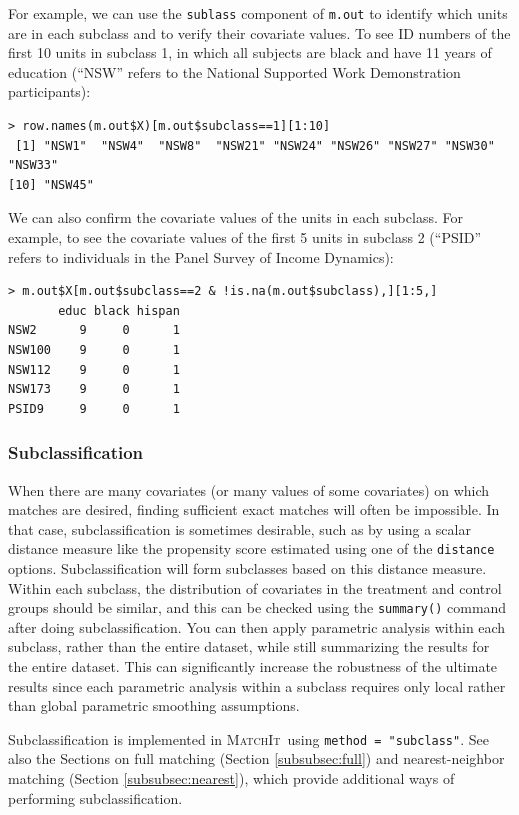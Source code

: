 \documentclass[oneside,letterpaper,titlepage]{article}
\newcommand{\MatchIt}{\textsc{MatchIt}}
\begin{document}
For example, we can use the {\tt sublass} component of {\tt m.out} to
identify which units are in each subclass and to verify their
covariate values.  To see ID numbers of the first 10 units in subclass
1, in which all subjects are black and have 11 years of education
(``NSW'' refers to the National Supported Work Demonstration
participants):
\begin{verbatim}
> row.names(m.out$X)[m.out$subclass==1][1:10]
 [1] "NSW1"  "NSW4"  "NSW8"  "NSW21" "NSW24" "NSW26" "NSW27" "NSW30" "NSW33"
[10] "NSW45"
\end{verbatim}
We can also confirm the covariate values of the units in each
subclass.  For example, to see the covariate values of the first 5
units in subclass 2 (``PSID'' refers to individuals in the Panel
Survey of Income Dynamics):
\begin{verbatim}
> m.out$X[m.out$subclass==2 & !is.na(m.out$subclass),][1:5,]
       educ black hispan
NSW2      9     0      1
NSW100    9     0      1
NSW112    9     0      1
NSW173    9     0      1
PSID9     9     0      1
\end{verbatim}


\subsubsection{Subclassification}
\label{subsubsec:subclass}

When there are many covariates (or many values of some covariates) on
which matches are desired, finding sufficient exact matches will often
be impossible.  In that case, subclassification is sometimes
desirable, such as by using a scalar distance measure like the
propensity score estimated using one of the \texttt{distance} options.
Subclassification will form subclasses based on this distance measure.
Within each subclass, the distribution of covariates in the treatment
and control groups should be similar, and this can be checked using
the \texttt{summary()} command after doing subclassification.  You can
then apply parametric analysis within each subclass, rather than the
entire dataset, while still summarizing the results for the entire
dataset.  This can significantly increase the robustness of the
ultimate results since each parametric analysis within a subclass
requires only local rather than global parametric smoothing
assumptions.

Subclassification is implemented in \MatchIt\ using \texttt{method =
  "subclass"}.  See also the Sections on full matching (Section
\ref{subsubsec:full}) and nearest-neighbor matching (Section
\ref{subsubsec:nearest}), which provide additional ways of performing
subclassification.
\end{document}
